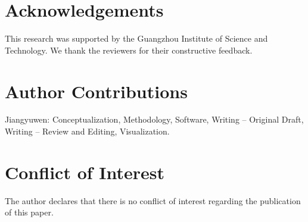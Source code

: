 \documentclass{ijSmartGrid}
\theoremstyle{definition}
\begin{document}
\section*{Acknowledgements}

This research was supported by the Guangzhou Institute of Science and Technology. We thank the reviewers for their constructive feedback.

\section*{Author Contributions}

Jiangyuwen: Conceptualization, Methodology, Software, Writing -- Original Draft, Writing -- Review and Editing, Visualization.

\section*{Conflict of Interest}

The author declares that there is no conflict of interest regarding the publication of this paper.
\end{document}
